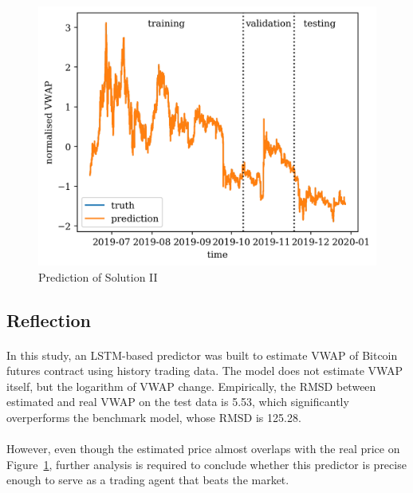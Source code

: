 \documentclass[12pt, letterpaper]{article}
\begin{document}
\begin{figure}
    \centering
    \includegraphics{figures/pred_lstmratio.png}
    \caption{Prediction of Solution II}%
    \label{fig:pred2}
\end{figure}

\subsection{Reflection}

\paragraph{}
In this study, an LSTM-based predictor was built to estimate VWAP of Bitcoin futures contract using history trading data. The model does not estimate VWAP itself, but the logarithm of VWAP change. Empirically, the RMSD between estimated and real VWAP on the test data is 5.53, which significantly overperforms the benchmark model, whose RMSD is 125.28.

\paragraph{}
However, even though the estimated price almost overlaps with the real price on Figure~\ref{fig:pred2}, further analysis is required to conclude whether this predictor is precise enough to serve as a trading agent that beats the market.

\end{document}
